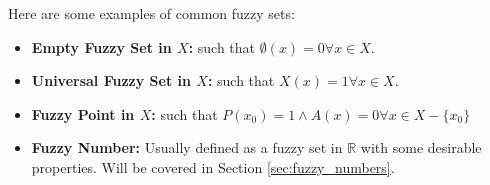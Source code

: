 \begin{example}
    Here are some examples of common fuzzy sets:
    \begin{itemize}
        \item \textbf{Empty Fuzzy Set in $X$:} such that $\emptyset(x)=0 \forall x \in X$.
        \item \textbf{Universal Fuzzy Set in $X$:} such that $X(x)=1  \forall x \in X$.
        \item \textbf{Fuzzy Point in $X$:} such that $P(x_0)=1 \land A(x)=0 \forall x \in X-\{x_0\}$
        \item \textbf{Fuzzy Number:} Usually defined as a fuzzy set in $\mathbb{R}$ with some desirable properties. Will be covered in Section \ref{sec:fuzzy_numbers}.
    \end{itemize}
\end{example}
